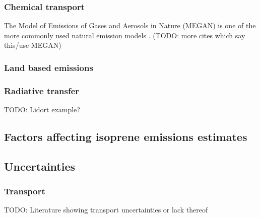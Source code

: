       
      
    \subsubsection{Chemical transport} %
      
      
      The Model of Emissions of Gases and Aerosols in Nature (MEGAN) is one of the more commonly used natural emission models \citep{Monks2015}. (TODO: more cites which say this/use MEGAN)
    
    \subsubsection{Land based emissions} %
      
      
      

    \subsubsection{Radiative transfer} %
      TODO: Lidort example?
    
  \subsection{Factors affecting isoprene emissions estimates}

      

      
      
      
      
  
  \subsection{Uncertainties}
    \label{LR:Models:Unc}
    
    
    
    
    
      
    
    \subsubsection{Transport}
      \label{LR:Models:Unc:Transport}
      TODO: Literature showing transport uncertainties or lack thereof     
    
    
    
    
      
    
